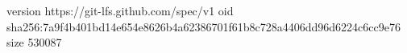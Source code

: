 version https://git-lfs.github.com/spec/v1
oid sha256:7a9f4b401bd14e654e8626b4a62386701f61b8c728a4406dd96d6224c6cc9e76
size 530087
